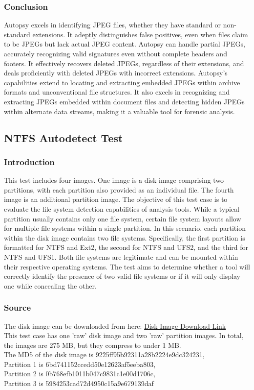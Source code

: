 \documentclass{extarticle}
\begin{document}
\subsubsection*{Conclusion}
Autopsy excels in identifying JPEG files, whether they have standard or non-standard extensions. It adeptly distinguishes false positives, even when files claim to be JPEGs but lack actual JPEG content. Autopsy can handle partial JPEGs, accurately recognizing valid signatures even without complete headers and footers. It effectively recovers deleted JPEGs, regardless of their extensions, and deals proficiently with deleted JPEGs with incorrect extensions. Autopsy's capabilities extend to locating and extracting embedded JPEGs within archive formats and unconventional file structures. It also excels in recognizing and extracting JPEGs embedded within document files and detecting hidden JPEGs within alternate data streams, making it a valuable tool for forensic analysis.

\subsection{NTFS Autodetect Test}
\subsubsection*{Introduction}
This test includes four images. One image is a disk image comprising two partitions, with each partition also provided as an individual file. The fourth image is an additional partition image. The objective of this test case is to evaluate the file system detection capabilities of analysis tools. While a typical partition usually contains only one file system, certain file system layouts allow for multiple file systems within a single partition. In this scenario, each partition within the disk image contains two file systems. Specifically, the first partition is formatted for NTFS and Ext2, the second for NTFS and UFS2, and the third for NTFS and UFS1. Both file systems are legitimate and can be mounted within their respective operating systems. The test aims to determine whether a tool will correctly identify the presence of two valid file systems or if it will only display one while concealing the other.
\subsubsection*{Source}
The disk image can be downloaded from here:
\href{http://prdownloads.sourceforge.net/dftt/10b-ntfs-autodetect.zip?download}{Disk Image Download Link} \\
This test case has one ’raw’ disk image and two ’raw’ partition images. In total, the images are 275 MB, but they compress to under 1 MB.\\
The MD5 of the disk image is 9225ff95b92311a28b2224e9dc324231,\\
Partition 1 is 6bd741152ccedd50e12623af5eeba803,\\
Partition 2 is 0b768efb1011b047c9831c1e00d1706c,\\ Partition 3 is 5984253cad72d4950c15a9e679139daf
\end{document}
